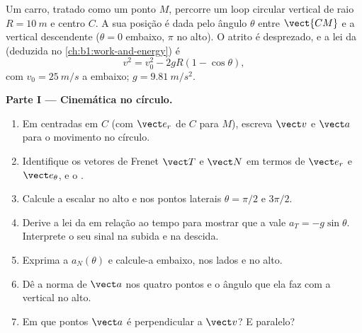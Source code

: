 \begin{problem}
\label{pb:b1:point-kinematics:1}
Um carro, tratado como um ponto $M$, percorre um loop circular vertical de
raio $R = \qty{10}{m}$ e centro $C$. A sua posição é dada pelo
ângulo $\theta$ entre $\vect{CM}$ e a vertical descendente ($\theta =
0$ embaixo, $\pi$ no alto). O atrito é desprezado, e a
lei da  (deduzida no \cref{ch:b1:work-and-energy}) é
\[
v^2 = v_0^2 - 2gR(1 - \cos\theta),
\]
com $v_0 = \qty{25}{m/s}$ a  embaixo; $g = \qty{9.81}{m/s^2}$.

\medskip
\noindent\textbf{Parte I --- Cinemática no círculo.}
\begin{enumerate}
  \item Em  centradas em $C$ (com $\vect e_r$ de $C$
        para $M$), escreva $\vect v$ e $\vect a$ para o movimento no círculo.
  \item Identifique os vetores de Frenet $\vect T$ e $\vect N$ em termos de
        $\vect e_r$ e $\vect e_\theta$, e o .
  \item Calcule a  escalar no alto e nos pontos laterais
        $\theta = \pi/2$ e $3\pi/2$.
  \item Derive a lei da  em relação ao tempo para mostrar que
        a  vale $a_T = -g\sin\theta$. Interprete
        o seu sinal na subida e na descida.
  \item Exprima a  $a_N(\theta)$ e calcule-a
        embaixo, nos lados e no alto.
  \item Dê a norma de $\vect a$ nos quatro pontos e o ângulo que ela
        faz com a vertical no alto.
  \item Em que pontos $\vect a$ é perpendicular a $\vect v$? E paralelo?
\end{enumerate}


\end{problem}
